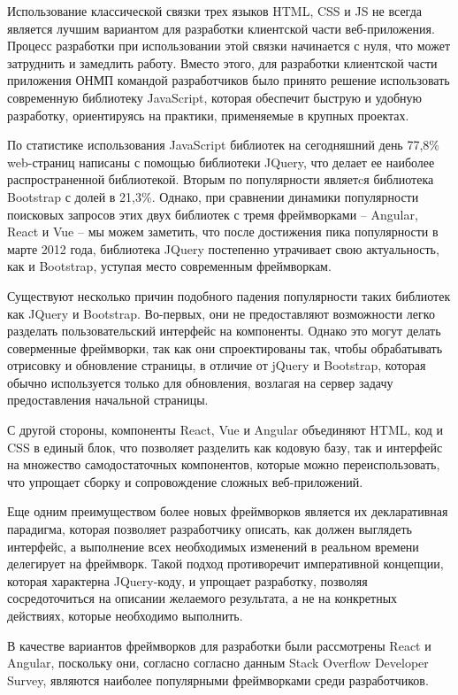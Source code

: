 Использование классической связки трех языков HTML, CSS и JS не всегда является лучшим вариантом для разработки клиентской части веб-приложения. Процесс разработки при использовании этой связки начинается с нуля, что может затруднить и замедлить работу. Вместо этого, для разработки клиентской части приложения ОНМП командой разработчиков было принято решение использовать современную библиотеку JavaScript, которая обеспечит быструю и удобную разработку,  ориентируясь на практики, применяемые в крупных проектах.

По статистике использования JavaScript библиотек на сегодняшний день 77,8\% web-страниц написаны с помощью библиотеки JQuery, что делает ее наиболее распространенной библиотекой. Вторым по популярности являетcя библиотека Bootstrap с долей в 21,3\%. Однако, при сравнении динамики популярности поисковых запросов этих двух библиотек с тремя фреймворками -- Angular, React и Vue -- мы можем заметить, что после достижения пика популярности в марте 2012 года, библиотека JQuery постепенно утрачивает свою актуальность, как и Bootstrap, уступая место современным фреймворкам.

Существуют несколько причин подобного падения популярности таких библиотек как JQuery и Bootstrap. Во-первых, они не предоставляют возможности легко разделать пользовательский интерфейс на компоненты. Однако это могут делать соверменные фреймворки, так как они спроектированы так, чтобы обрабатывать отрисовку и обновление страницы, в отличие от jQuery и Bootstrap, которая обычно используется только для обновления, возлагая на сервер задачу предоставления начальной страницы.

С другой стороны, компоненты React, Vue и Angular объединяют HTML, код и CSS в единый блок, что позволяет разделить как кодовую базу, так и интерфейс на множество самодостаточных компонентов, которые можно переиспользовать, что упрощает сборку и сопровождение сложных веб-приложений.

Еще одним преимуществом более новых фреймворков является их декларативная парадигма, которая позволяет разработчику описать, как должен выглядеть интерфейс, а выполнение всех необходимых изменений в реальном времени делегирует на фреймворк. Такой подход противоречит императивной концепции, которая характерна JQuery-коду, и упрощает разработку, позволяя сосредоточиться на описании желаемого результата, а не на конкретных действиях, которые необходимо выполнить.

В качестве вариантов фреймворков для разработки были рассмотрены React и Angular, поскольку они, согласно согласно данным Stack Overflow Developer Survey, являются наиболее популярными фреймворками среди разработчиков.

